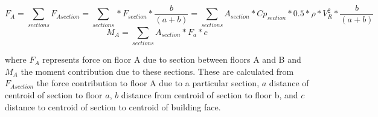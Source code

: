 \[
F_A = \sum\limits_{sections} F_{A section} = \sum\limits_{sections} * F_{section} * \frac{b}{(a+b)} = \sum\limits_{sections} A_{section} * Cp_{section} * 0.5 * \rho *  V_R^2 * \frac{b}{(a+b)}
\]
\[
M_A =  \sum\limits_{sections} A_{section} * F_a *  c
\]

where $F_A$ represents force on floor A due to section between floors A and B and  $M_A$ the moment contribution due to these sections. These are calculated from $F_{A section}$ the force contribution to floor A due to a particular section, $a$ distance of centroid of section to floor $a$, $b$ distance from centroid of section to floor b, and $c$ distance to centroid of section to centroid of building face.




